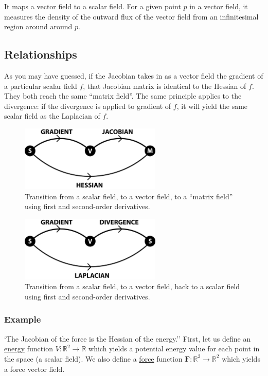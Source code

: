 \documentclass{article}
\begin{document}
It maps a vector field to a scalar field. For a given point $p$ in a vector
field, it measures the density of the outward flux of the vector field from an
infinitesimal region around around $p$.
\subsection{Relationships}
As you may have guessed, if the Jacobian takes in as a vector field the gradient
of a particular scalar field $f$, that Jacobian matrix is identical to the
Hessian of $f$. They both reach the same ``matrix field''. The same principle
applies to the divergence: if the divergence is applied to gradient of $f$, it
will yield the same scalar field as the Laplacian of $f$.
\begin{figure}[H]
  \centering
  \includegraphics[width=0.6\textwidth]{img/hessian.png}
  \caption{Transition from a scalar field, to a vector field, to a ``matrix
  field'' using first and second-order derivatives.}    
\end{figure}

\begin{figure}[H]
  \centering
  \includegraphics[width=0.6\textwidth]{img/laplacian.png}
  \caption{Transition from a scalar field, to a vector field, back to a scalar
  field using first and second-order derivatives.}    
\end{figure}

\subsubsection{Example}
`The Jacobian of the force is the Hessian of the energy.'' First, let us define
an \underline{energy} function $V : \mathbb{R}^2 \rightarrow \mathbb{R}$ which
yields a potential energy value for each point in the space (a scalar field). We
also define a \underline{force} function $\mathbf{F} : \mathbb{R}^2 \rightarrow
\mathbb{R}^2$ which yields a force vector field.
\end{document}
